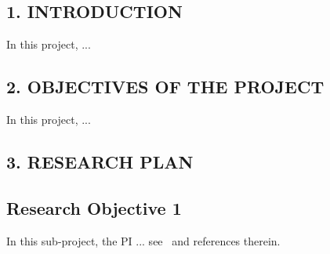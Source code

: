 \documentclass[../preamble.tex]{subfiles}
\begin{document}
%
% 
%
%
% 

%
%
\subsection{1. INTRODUCTION} %
%
% 
%

In this project, ...

\subsection{2. OBJECTIVES OF THE PROJECT}
%
% 

In this project, ...


%
%
\subsection{3. RESEARCH PLAN} 
%

\subsection{Research Objective 1}
In this sub-project, the PI ... see~\cite{knuth2014art} and references therein.
\end{document}
